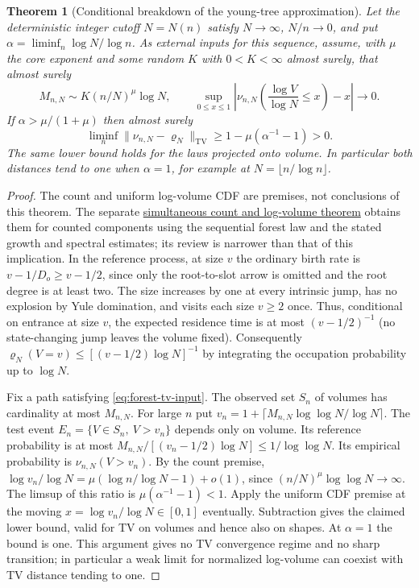 \documentclass[11pt]{article}
\newcommand{\proofsrc}[2]{\href{https://github.com/uzay-eth/friend-tree-exponent/blob/a0972085ad72ad5685ae7b424988648d1965e73c/#1}{#2}}
\newtheorem{theorem}{Theorem}
\newcommand{\resulttag}{?}
\newcommand{\tagnext}[1]{\renewcommand{\resulttag}{#1}}
\theoremstyle{remark}
\numberwithin{equation}{section}
\begin{document}
\tagnext{FOR}
\begin{theorem}[Conditional breakdown of the young-tree approximation]\label{th:forest-tv-obstruction}
Let the deterministic integer cutoff $N=N(n)$ satisfy $N\to\infty$, $N/n\to0$, and put $\alpha=\liminf_n\log N/\log n$. As external inputs for this sequence, assume, with $\mu$ the core exponent and some random $K$ with $0<K<\infty$ almost surely, that almost surely
\begin{equation}\label{eq:forest-tv-input}
 M_{n,N}\sim K(n/N)^\mu\log N,\qquad
 \sup_{0\le x\le1}\left|\nu_{n,N}\!\left(\frac{\log V}{\log N}\le x\right)-x\right|\longrightarrow0.
\end{equation}
If $\alpha>\mu/(1+\mu)$ then almost surely
\[
 \liminf_n\|\nu_{n,N}-\varrho_N\|_{\mathrm{TV}}
 \ge 1-\mu(\alpha^{-1}-1)>0.
\]
The same lower bound holds for the laws projected onto volume. In particular both distances tend to one when $\alpha=1$, for example at $N=\lfloor n/\log n\rfloor$.
\end{theorem}
\begin{proof}
The count and uniform log-volume CDF are premises, not conclusions of this theorem. The separate \proofsrc{round2/proofs/neon2/q5/README.md}{simultaneous count and log-volume theorem} obtains them for counted components using the sequential forest law and the stated growth and spectral estimates; its review is narrower than that of this implication. In the reference process, at size $v$ the ordinary birth rate is $v-1/D_o\ge v-1/2$, since only the root-to-slot arrow is omitted and the root degree is at least two. The size increases by one at every intrinsic jump, has no explosion by Yule domination, and visits each size $v\ge2$ once. Thus, conditional on entrance at size $v$, the expected residence time is at most $(v-1/2)^{-1}$ (no state-changing jump leaves the volume fixed). Consequently $\varrho_N(V=v)\le[(v-1/2)\log N]^{-1}$ by integrating the occupation probability up to $\log N$.

Fix a path satisfying \eqref{eq:forest-tv-input}. The observed set $S_n$ of volumes has cardinality at most $M_{n,N}$. For large $n$ put $v_n=1+\lceil M_{n,N}\log\log N/\log N\rceil$. The test event $E_n=\{V\in S_n,\ V>v_n\}$ depends only on volume. Its reference probability is at most $M_{n,N}/[(v_n-1/2)\log N]\le1/\log\log N$. Its empirical probability is $\nu_{n,N}(V>v_n)$. By the count premise, $\log v_n/\log N=\mu(\log n/\log N-1)+o(1)$, since $(n/N)^\mu\log\log N\to\infty$. The limsup of this ratio is $\mu(\alpha^{-1}-1)<1$. Apply the uniform CDF premise at the moving $x=\log v_n/\log N\in[0,1]$ eventually. Subtraction gives the claimed lower bound, valid for TV on volumes and hence also on shapes. At $\alpha=1$ the bound is one. This argument gives no TV convergence regime and no sharp transition; in particular a weak limit for normalized log-volume can coexist with TV distance tending to one.
\end{proof}
\end{document}

